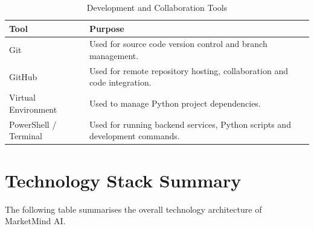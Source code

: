 \documentclass[12pt,a4paper]{report}
\begin{document}
\begin{table}[H]
\centering

\caption{Development and Collaboration Tools}

\begin{tabular}{p{4cm} p{9cm}}

\toprule

\textbf{Tool} &
\textbf{Purpose}

\\

\midrule

Git &
Used for source code version control and branch management.

\\[6pt]

GitHub &
Used for remote repository hosting, collaboration and code integration.

\\[6pt]

Virtual Environment &
Used to manage Python project dependencies.

\\[6pt]

PowerShell / Terminal &
Used for running backend services, Python scripts and development
commands.

\\

\bottomrule

\end{tabular}

\end{table}



\section{Technology Stack Summary}

The following table summarises the overall technology architecture of
MarketMind AI.
\end{document}
